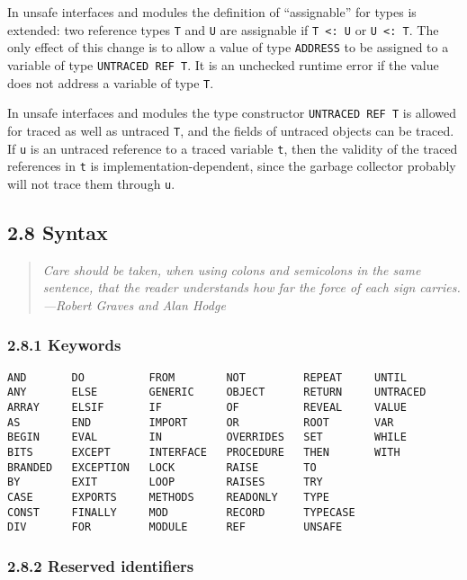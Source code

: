 \documentclass[10pt]{article}
\begin{document}
In unsafe interfaces and modules the definition of ``assignable'' for types is
extended: two reference types \verb|T| and \verb|U| are assignable if
\verb|T <: U| or \verb|U <: T|.  The only effect of this change is to allow a
value of type \verb|ADDRESS| to be assigned to a variable of type
\verb|UNTRACED REF T|.  It is an unchecked runtime error if the value does not
address a variable of type \verb|T|.

In unsafe interfaces and modules the type constructor \verb|UNTRACED REF T| is
allowed for traced as well as untraced \verb|T|, and the fields of untraced
objects can be traced.  If \verb|u| is an untraced reference to a traced
variable \verb|t|, then the validity of the traced references in \verb|t| is
implementation-dependent, since the garbage collector probably will not trace
them through \verb|u|.

\subsection*{2.8 Syntax}

\begin{quote}
  \emph{Care should be taken, when using colons and semicolons in the same
    sentence, that the reader understands how far the force of each sign
    carries.  ---Robert Graves and Alan Hodge}
\end{quote}

\subsubsection*{2.8.1 Keywords}

\begin{verbatim}
AND       DO          FROM        NOT         REPEAT     UNTIL
ANY       ELSE        GENERIC     OBJECT      RETURN     UNTRACED
ARRAY     ELSIF       IF          OF          REVEAL     VALUE
AS        END         IMPORT      OR          ROOT       VAR
BEGIN     EVAL        IN          OVERRIDES   SET        WHILE
BITS      EXCEPT      INTERFACE   PROCEDURE   THEN       WITH
BRANDED   EXCEPTION   LOCK        RAISE       TO
BY        EXIT        LOOP        RAISES      TRY
CASE      EXPORTS     METHODS     READONLY    TYPE
CONST     FINALLY     MOD         RECORD      TYPECASE
DIV       FOR         MODULE      REF         UNSAFE
\end{verbatim}

\subsubsection*{2.8.2 Reserved identifiers}
\end{document}
